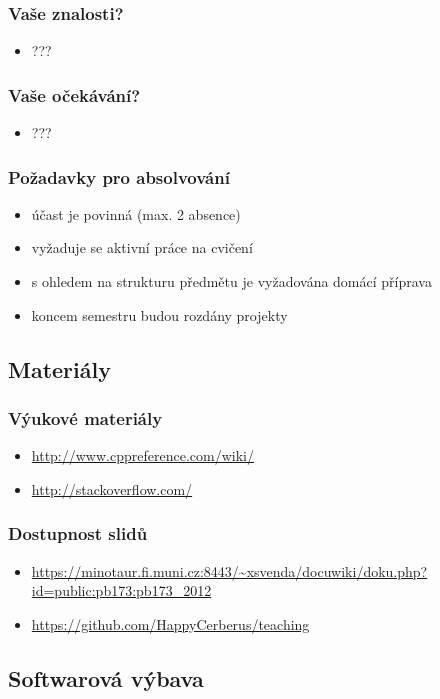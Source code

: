 \begin{frame}
	\frametitle{Vaše znalosti?}
	\begin{itemize}
		\item ???
	\end{itemize}
\end{frame}

\begin{frame}
	\frametitle{Vaše očekávání?}
	\begin{itemize}
		\item ???
	\end{itemize}
\end{frame}

\begin{frame}
	\frametitle{Požadavky pro absolvování}
	\begin{itemize}
		\item{účast je povinná (max. 2 absence)}
		\item{vyžaduje se aktivní práce na cvičení}
		\item{s ohledem na strukturu předmětu je vyžadována domácí příprava}
		\item{koncem semestru budou rozdány projekty}
	\end{itemize}
\end{frame}

\subsection{Materiály}

\begin{frame}
	\frametitle{Výukové materiály}
	\begin{itemize}
		\item{\url{http://www.cppreference.com/wiki/}}
		\item{\url{http://stackoverflow.com/}}
	\end{itemize}
\end{frame}

\begin{frame}
\frametitle{Dostupnost slidů}
	\begin{itemize}
		\item{\url{https://minotaur.fi.muni.cz:8443/~xsvenda/docuwiki/doku.php?id=public:pb173:pb173\_2012}}
		\item{\url{https://github.com/HappyCerberus/teaching}}
	\end{itemize}
\end{frame}

\subsection{Softwarová výbava}

